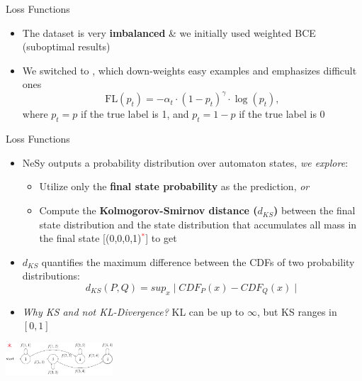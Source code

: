 \documentclass[10pt, aspectratio=169]{beamer}
\begin{document}
\begin{frame}{Loss Functions}
    \begin{itemize}
    \setlength{\itemsep}{15pt}
    \item The dataset is very \textbf{imbalanced} \& we initially used weighted BCE (suboptimal results)
    \item We switched to , which down-weights easy examples and emphasizes difficult ones
     $$\text{FL}(p_t) = - \alpha_t \cdot (1 - p_t)^\gamma \cdot \log(p_t),$$
        where $p_t=p$ if the true label is 1, and $p_t=1-p$ if the true label is 0
    \end{itemize}
\end{frame}

\begin{frame}{Loss Functions}%

    \begin{itemize}
    \setlength{\itemsep}{12pt}
    \item NeSy outputs a \textcolor{umBlueLighter}{probability distribution} over automaton states, \textit{we explore}:
    \vspace{5pt}
    \begin{itemize}
        \setlength{\itemsep}{3pt}
        \item Utilize only the \textbf{final state probability} as the prediction, \textit{or}
        \item Compute the \textbf{Kolmogorov-Smirnov distance ($d_{KS}$)} between the final state distribution and the state distribution that accumulates all mass in the final state [(0,0,0,1)\textcolor{red}{$^\ast$}] to
        get 
    \end{itemize}
        \item $d_{KS}$ quantifies the maximum difference between the CDFs of two probability distributions: $$d_{KS}(P,Q) = sup_x \mid CDF_P(x) - CDF_Q(x)\mid $$
        \item \textit{Why KS and not KL-Divergence?} KL can be up to $\infty$, but KS ranges in $[0,1]$
    \end{itemize}
    \hfill \includegraphics[width=0.3\textwidth]{contents/images/automaton}
\end{frame}
\end{document}
